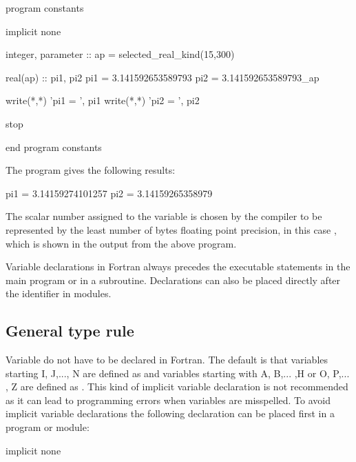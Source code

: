 \begin{fortrancodeenv}
program constants

    implicit none

    integer, parameter :: ap = selected_real_kind(15,300)

    real(ap) :: pi1, pi2
    pi1 = 3.141592653589793
    pi2 = 3.141592653589793_ap

    write(*,*) 'pi1 = ', pi1
    write(*,*) 'pi2 = ', pi2

    stop

end program constants
\end{fortrancodeenv}

The program gives the following results:

\cmdmode

\begin{fortrancodeenv}
pi1 = 3.14159274101257
pi2 = 3.14159265358979
\end{fortrancodeenv}

\fmode

The scalar number assigned to the variable  is chosen by the compiler to be represented by the least number of bytes floating point precision, in this case , which is shown in the output from the above program. 

Variable declarations in Fortran always precedes the executable statements in the main program or in a subroutine. Declarations can also be placed directly after the  identifier in modules. 

\subsection{General type rule}

Variable do not have to be declared in Fortran. The default is that variables starting I, J,..., N are defined as  and variables starting with A, B,... ,H or O, P,... , Z are defined as . This kind of implicit variable declaration is not recommended as it can lead to programming errors when variables are misspelled. To avoid implicit variable declarations the following declaration can be placed first in a program or module:

\fmode

\begin{fortrancodeenv}
implicit none
\end{fortrancodeenv}

